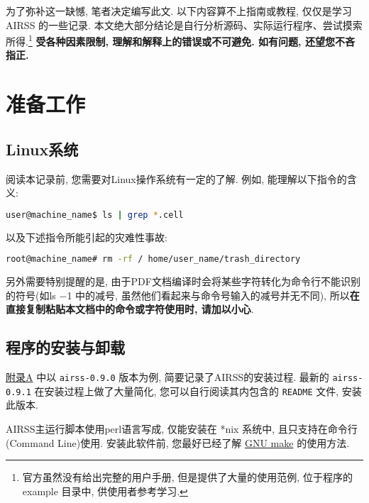 \documentclass[a4paper, 10pt]{article}
\begin{document}
为了弥补这一缺憾, 笔者决定编写此文. 以下内容算不上指南或教程, 仅仅是学习 AIRSS 的一些记录. 本文绝大部分结论是自行分析源码、实际运行程序、尝试摸索所得.\footnote{官方虽然没有给出完整的用户手册, 但是提供了大量的使用范例, 位于程序的 example 目录中, 供使用者参考学习.} \textbf{受各种因素限制, 理解和解释上的错误或不可避免. 如有问题, 还望您不吝指正.}


\newpage
\section{准备工作}
\subsection{Linux系统} 
阅读本记录前, 您需要对Linux操作系统有一定的了解. 例如, 能理解以下指令的含义:
\begin{lstlisting}[language={bash}]
user@machine_name$ ls | grep *.cell
\end{lstlisting}

以及下述指令所能引起的灾难性事故:
\begin{lstlisting}[language={bash}]
root@machine_name# rm -rf / home/user_name/trash_directory
\end{lstlisting}

另外需要特别提醒的是, 由于PDF文档编译时会将某些字符转化为命令行不能识别的符号(如ls \(-\)1 中的减号, 虽然他们看起来与命令号输入的减号并无不同), 所以\textbf{在直接复制粘贴本文档中的命令或字符使用时, 请加以小心}.

\subsection{程序的安装与卸载}
\hyperref[sec:airss-install]{附录A} 中以 \verb|airss-0.9.0| 版本为例, 简要记录了AIRSS的安装过程. 最新的 \verb|airss-0.9.1| 在安装过程上做了大量简化, 您可以自行阅读其内包含的 \verb|README| 文件, 安装此版本.

AIRSS主运行脚本使用perl语言写成, 仅能安装在 *nix 系统中, 且只支持在命令行(Command Line)使用. 安装此软件前, 您最好已经了解 \href{https://www.gnu.org/software/make/manual/}{GNU make} 的使用方法.
\end{document}
